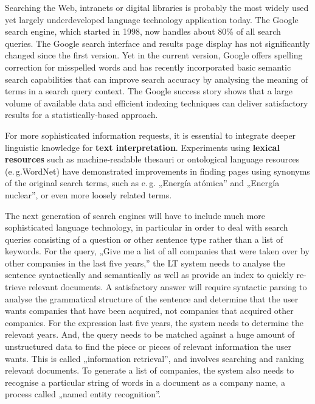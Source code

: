 \begin{multicols}{2}
Searching the Web, intranets or digital libraries is probably the most widely used yet largely underdeveloped language technology application today. The Google search engine, which started in 1998, now handles about 80\% of all search queries. The Google search interface and results page display has not significantly changed since the first version. Yet in the current version, Google offers spelling correction for misspelled words and has recently incorporated basic semantic search capabilities that can improve search accuracy by analysing the meaning of terms in a search query context.  The Google success story shows that a large volume of available data and efficient indexing techniques can deliver satisfactory results for a statistically-based approach.

For more sophisticated information requests, it is essential to integrate deeper linguistic knowledge for \textbf{text interpretation}. Experiments using \textbf{lexical resources} such as machine-readable thesauri or ontological language resources (e.\,g.WordNet) have demonstrated improvements in finding pages using synonyms of the original search terms, such as e.\,g. „Energía atómica” and „Energía nuclear”, or even more loosely related terms. 


The next generation of search engines will have to include much more sophisticated language technology, in particular in order to deal with search queries consisting of a question or other sentence type rather than a list of keywords. For the query, „Give me a list of all companies that were taken over by other companies in the last five years,” the LT system needs to analyse the sentence syntactically and semantically as well as provide an index to quickly re-trieve relevant documents. A satisfactory answer will require syntactic parsing to analyse the grammatical structure of the sentence and determine that the user wants companies that have been acquired, not companies that acquired other companies. For the expression last five years, the system needs to determine the relevant years. And, the query needs to be matched against a huge amount of unstructured data to find the piece or pieces of relevant information the user wants. This is called „information retrieval”, and involves searching and ranking relevant documents. To generate a list of companies, the system also needs to recognise a particular string of words in a document as a company name, a process called „named entity recognition”.


\end{multicols}
